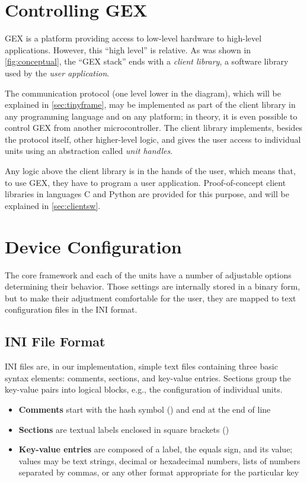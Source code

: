 \section{Controlling GEX}

GEX is a platform providing access to low-level hardware to high-level applications. However, this ``high level'' is relative. As was shown in \cref{fig:conceptual}, the ``GEX stack'' ends with a \textit{client library}, a software library used by the \textit{user application}.

The communication protocol (one level lower in the diagram), which will be explained in \cref{sec:tinyframe}, may be implemented as part of the client library in any programming language and on any platform; in theory, it is even possible to control GEX from another microcontroller. The client library implements, besides the protocol itself, other higher-level logic, and gives the user access to individual units using an abstraction called \textit{unit handles}.

Any logic above the client library is in the hands of the user, which means that, to use GEX, they have to program a user application. Proof-of-concept client libraries in languages C and Python are provided for this purpose, and will be explained in \cref{sec:clientsw}.

\section{Device Configuration}

The core framework and each of the units have a number of adjustable options determining their behavior. Those settings are internally stored in a binary form, but to make their adjustment comfortable for the user, they are mapped to text configuration files in the INI format.

\subsection{INI File Format}

INI files are, in our implementation, simple text files containing three basic syntax elements: comments, sections, and key-value entries. Sections group the key-value pairs into logical blocks, e.g., the configuration of individual units.

\begin{itemize}	
	\item \textbf{Comments} start with the hash symbol (\mono{\#}) and end at the end of line
	\item \textbf{Sections} are textual labels enclosed in square brackets (\mono{[UNITS]})
	\item \textbf{Key-value entries} are composed of a label, the equals sign, and its value; values may be text strings, decimal or hexadecimal numbers, lists of numbers separated by commas, or any other format appropriate for the particular key
\end{itemize}

